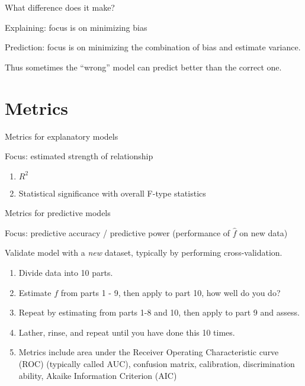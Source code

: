 \documentclass[
  12pt,
  ignorenonframetext,
]{beamer}
\providecommand{\tightlist}{%
  \setlength{\itemsep}{0pt}\setlength{\parskip}{0pt}}
\begin{document}
\begin{frame}{What difference does it make?}
\protect\hypertarget{what-difference-does-it-make-3}{}

Explaining: focus is on minimizing bias

Prediction: focus is on minimizing the combination of bias and estimate
variance.

Thus sometimes the ``wrong'' model can predict better than the correct
one.

\end{frame}

\hypertarget{metrics}{%
\section{Metrics}\label{metrics}}

\begin{frame}{Metrics for explanatory models}
\protect\hypertarget{metrics-for-explanatory-models}{}

Focus: estimated strength of relationship

\begin{enumerate}[<+->]
\tightlist
\item
  \(R^2\)
\item
  Statistical significance with overall F-type statistics
\end{enumerate}

\end{frame}

\begin{frame}{Metrics for predictive models}
\protect\hypertarget{metrics-for-predictive-models}{}

Focus: predictive accuracy / predictive power (performance of
\(\hat{f}\) on new data)

Validate model with a \emph{new} dataset, typically by performing
cross-validation.

\begin{enumerate}[<+->]
\tightlist
\item
  Divide data into 10 parts.
\item
  Estimate \(f\) from parts 1 - 9, then apply to part 10, how well do
  you do?
\item
  Repeat by estimating from parts 1-8 and 10, then apply to part 9 and
  assess.
\item
  Lather, rinse, and repeat until you have done this 10 times.
\item
  Metrics include area under the Receiver Operating Characteristic curve
  (ROC) (typically called AUC), confusion matrix, calibration,
  discrimination ability, Akaike Information Criterion (AIC)
\end{enumerate}

\end{frame}
\end{document}
